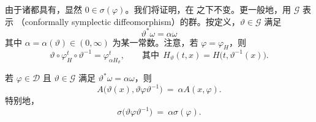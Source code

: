 由于诸\trHamiltonianFunction{}都具有\trCompactSupport，显然%
$0\in\sigma(\varphi)$。我们将证明，\trActionSpectrum{}在\trSymplectic\trConjugate{}%
之下不变。更一般地，用 $\mathcal{G}$ 表示\textbf{\trConformal\trSymplecticDiffeomorphism}%
（conformally symplectic diffeomorphism）的群。按定义，$\vartheta\in\mathcal{G}$ 满足
\begin{equation}\label{eq:conformal-pullback}
\vartheta^{*}\omega=\alpha\omega
\end{equation}
其中 $\alpha=\alpha(\vartheta)\in(0,\infty)$ 为某一常数。注意，若%
$\varphi=\varphi_{H}$，则
\begin{equation}\label{eq:conjugated-flow}
\vartheta\circ\varphi_{H}^{t}\circ\vartheta^{-1}=\varphi_{\alpha H_{\vartheta}}^{t},%
\qquad\text{其中}\ \ H_{\vartheta}(t,x)=H\bigl(t,\vartheta^{-1}(x)\bigr).
\end{equation}

\begin{proposition}\label{prop:spectrum-conjugation}
若 $\varphi\in\mathcal{D}$ 且 $\vartheta\in\mathcal{G}$ 满足%
$\vartheta^{*}\omega=\alpha\omega$，则
\begin{equation*}
A\bigl(\vartheta(x),\vartheta\varphi\vartheta^{-1}\bigr)\ =\ \alpha A(x,\varphi).
\end{equation*}
特别地，
\begin{equation*}
\sigma\bigl(\vartheta\varphi\vartheta^{-1}\bigr)\ =\ \alpha\sigma(\varphi).
\end{equation*}
\end{proposition}

